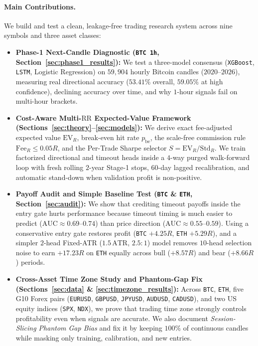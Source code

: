 \documentclass{article}
\newcommand{\EVR}{\mathrm{EV}_R}
\newcommand{\FeeR}{\mathrm{Fee}_R}
\newcommand{\StdR}{\mathrm{Std}_R}
\newcommand{\RR}{\mathrm{RR}}
\newcommand{\ATR}{\mathrm{ATR}}
\begin{document}
\paragraph{Main Contributions.} We build and test a clean, leakage-free trading research system across nine symbols and three asset classes:
\begin{itemize}
    \item \textbf{Phase-1 Next-Candle Diagnostic (\texttt{BTC 1h}, Section~\ref{sec:phase1_results}):} We test a three-model consensus (\texttt{XGBoost}, \texttt{LSTM}, Logistic Regression) on $59{,}904$ hourly Bitcoin candles ($2020$--$2026$), measuring real directional accuracy ($53.41\%$ overall, $59.05\%$ at high confidence), declining accuracy over time, and why $1$-hour signals fail on multi-hour brackets.
    \item \textbf{Cost-Aware Multi-$\RR$ Expected-Value Framework (Sections~\ref{sec:theory}--\ref{sec:models}):} We derive exact fee-adjusted expected value $\EVR$, break-even hit rate $p_{\mathrm{be}}$, the scale-free commission rule $\FeeR \le 0.05R$, and the Per-Trade Sharpe selector $S = \EVR / \StdR$. We train factorized directional and timeout heads inside a $4$-way purged walk-forward loop with fresh rolling $2$-year Stage-1 stops, $60$-day lagged recalibration, and automatic stand-down when validation profit is non-positive.
    \item \textbf{Payoff Audit and Simple Baseline Test (\texttt{BTC} \& \texttt{ETH}, Section~\ref{sec:audit}):} We show that crediting timeout payoffs inside the entry gate hurts performance because timeout timing is much easier to predict ($\mathrm{AUC} \approx 0.69$--$0.74$) than price direction ($\mathrm{AUC} \approx 0.55$--$0.59$). Using a conservative entry gate restores profit (\texttt{BTC} $+4.25R$, \texttt{ETH} $+5.29R$), and a simpler $2$-head Fixed-ATR ($1.5\,\ATR$, $2.5{:}1$) model removes $10$-head selection noise to earn $+17.23R$ on \texttt{ETH} equally across bull ($+8.57R$) and bear ($+8.66R$) periods.
    \item \textbf{Cross-Asset Time Zone Study and Phantom-Gap Fix (Sections~\ref{sec:data} \& \ref{sec:timezone_results}):} Across \texttt{BTC}, \texttt{ETH}, five G10 Forex pairs (\texttt{EURUSD}, \texttt{GBPUSD}, \texttt{JPYUSD}, \texttt{AUDUSD}, \texttt{CADUSD}), and two US equity indices (\texttt{SPX}, \texttt{NDX}), we prove that trading time zone strongly controls profitability even when signals are accurate. We also document \emph{Session-Slicing Phantom Gap Bias} and fix it by keeping $100\%$ of continuous candles while masking only training, calibration, and new entries.
\end{itemize}
\end{document}
